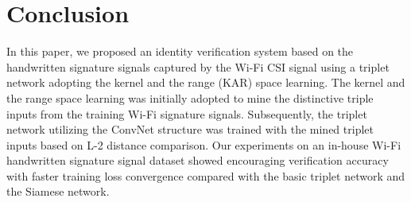 \documentclass[runningheads]{llncs}
\begin{document}
\section{Conclusion}
In this paper, we proposed an identity verification system based on the handwritten signature signals captured by the Wi-Fi CSI signal using a triplet network adopting the kernel and the range (KAR) space learning. 
The kernel and the range space learning was initially adopted to mine the distinctive triple inputs from the training Wi-Fi signature signals. 
Subsequently, the triplet network utilizing the ConvNet structure was trained with the mined triplet inputs based on L-2 distance comparison. 
Our experiments on an in-house Wi-Fi handwritten signature signal dataset showed encouraging verification accuracy with faster training loss convergence compared with the basic triplet network and the Siamese network.
%
%
%
%
%
%


\clearpage



\end{document}
